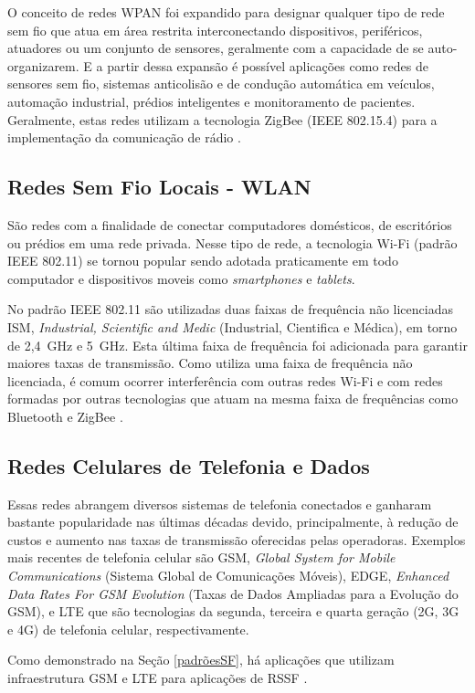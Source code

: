 O conceito de redes WPAN foi expandido para designar qualquer tipo de rede sem fio que atua em área restrita interconectando dispositivos, periféricos, atuadores ou um conjunto de sensores, geralmente com a capacidade de se auto-organizarem. E a partir dessa expansão é possível aplicações como redes de sensores sem fio, sistemas anticolisão e de condução automática em veículos, automação industrial, prédios inteligentes e monitoramento de pacientes. Geralmente, estas redes utilizam a tecnologia ZigBee (IEEE 802.15.4) para a implementação da comunicação de rádio \cite{rochol2018sistemas}.

\subsection{Redes Sem Fio Locais - WLAN}
São redes com a finalidade de conectar computadores domésticos, de escritórios ou prédios em uma rede privada. Nesse tipo de rede, a tecnologia Wi-Fi (padrão IEEE 802.11) se tornou popular sendo adotada praticamente em todo computador e dispositivos moveis como \emph{smartphones} e \emph{tablets}.

No padrão IEEE 802.11 são utilizadas duas faixas de frequência não licenciadas ISM, \emph{Industrial, Scientific and Medic} (Industrial, Cientifica e Médica), em torno de 2,4~GHz e 5~GHz. Esta última faixa de frequência foi adicionada para garantir maiores taxas de transmissão. Como utiliza uma faixa de frequência não licenciada, é comum ocorrer interferência com outras redes Wi-Fi e com redes formadas por outras tecnologias que atuam na mesma faixa de frequências como Bluetooth e ZigBee \cite{rochol2018sistemas}.

\subsection{Redes Celulares de Telefonia e Dados}
Essas redes abrangem diversos sistemas de telefonia conectados e ganharam bastante popularidade nas últimas décadas devido, principalmente, à redução de custos e aumento nas taxas de transmissão oferecidas pelas operadoras. Exemplos mais recentes de telefonia celular são GSM, \emph{Global System for Mobile Communications} (Sistema Global de Comunicações Móveis), EDGE, \emph{Enhanced Data Rates For GSM Evolution} (Taxas de Dados Ampliadas para a Evolução do GSM), e LTE que são tecnologias da segunda, terceira e quarta geração (2G, 3G e 4G) de telefonia celular, respectivamente.

Como demonstrado na Seção \ref{padrõesSF}, há aplicações que utilizam infraestrutura GSM e LTE para aplicações de RSSF \cite{rochol2018sistemas}.


